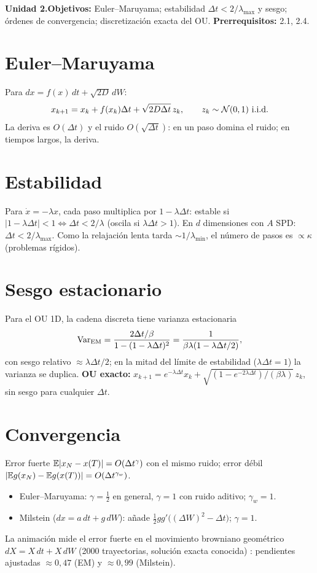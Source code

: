 \documentclass[11pt,a4paper]{article}
\begin{document}

\noindent\textbf{Unidad 2.}\quad\textbf{Objetivos:} Euler--Maruyama; estabilidad $\Delta t<2/\lambda_{\max}$ y sesgo; órdenes de
convergencia; discretización exacta del OU. \textbf{Prerrequisitos:} 2.1, 2.4.

\section{Euler--Maruyama}
Para $dx=f(x)\,dt+\sqrt{2D}\,dW$:
\begin{equation}x_{k+1}=x_k+f(x_k)\Delta t+\sqrt{2D\Delta t}\,z_k,\qquad z_k\sim\mathcal{N}(0,1)\ \text{i.i.d.}\end{equation}
La deriva es $O(\Delta t)$ y el ruido $O(\sqrt{\Delta t})$: en un paso domina el ruido; en tiempos largos, la deriva.

\section{Estabilidad}
Para $\dot x=-\lambda x$, cada paso multiplica por $1-\lambda\Delta t$: estable si $|1-\lambda\Delta t|<1\iff\Delta t<2/\lambda$
(oscila si $\lambda\Delta t>1$). En $d$ dimensiones con $A$ SPD: $\Delta t<2/\lambda_{\max}$. Como la relajación lenta tarda
$\sim1/\lambda_{\min}$, el número de pasos es $\propto\kappa$ (problemas rígidos).

\section{Sesgo estacionario}
Para el OU 1D, la cadena discreta tiene varianza estacionaria
\begin{equation}\operatorname{Var}_{\text{EM}}=\frac{2\Delta t/\beta}{1-(1-\lambda\Delta t)^2}=\frac{1}{\beta\lambda(1-\lambda\Delta t/2)},\end{equation}
con sesgo relativo $\approx\lambda\Delta t/2$; en la mitad del límite de estabilidad ($\lambda\Delta t=1$) la varianza se duplica.
\textbf{OU exacto:} $x_{k+1}=e^{-\lambda\Delta t}x_k+\sqrt{(1-e^{-2\lambda\Delta t})/(\beta\lambda)}\,z_k$, sin sesgo para cualquier $\Delta t$.

\section{Convergencia}
Error fuerte $\mathbb{E}|x_N-x(T)|=O(\Delta t^{\gamma})$ con el mismo ruido; error débil $|\mathbb{E} g(x_N)-\mathbb{E} g(x(T))|=O(\Delta t^{\gamma_w})$.
\begin{itemize}[nosep]
\item Euler--Maruyama: $\gamma=\frac12$ en general, $\gamma=1$ con ruido aditivo; $\gamma_w=1$.
\item Milstein ($dx=a\,dt+g\,dW$): añade $\frac12gg'\big((\Delta W)^2-\Delta t\big)$; $\gamma=1$.
\end{itemize}
La animación mide el error fuerte en el movimiento browniano geométrico $dX=X\,dt+X\,dW$ (2000 trayectorias,
solución exacta conocida) \evS: pendientes ajustadas $\approx0{,}47$ (EM) y $\approx0{,}99$ (Milstein).
\end{document}
